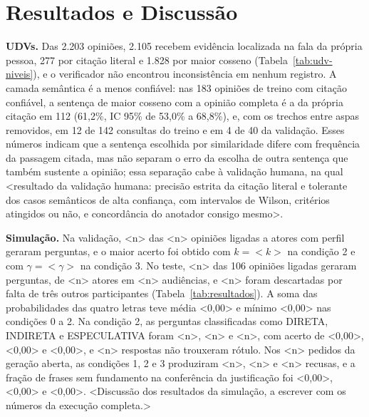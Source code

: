 \section{Resultados e Discuss\~ao}
\label{sec:resultados}

\textbf{UDVs.} Das 2.203 opiniões, 2.105 recebem evidência localizada na fala da própria pessoa, 277
por citação literal e 1.828 por maior cosseno (Tabela~\ref{tab:udv-niveis}), e o verificador não
encontrou inconsistência em nenhum registro. A camada semântica é a menos confiável: nas 183
opiniões de treino com citação confiável, a sentença de maior cosseno com a opinião completa é a da
própria citação em 112 (61,2\%, IC 95\% de 53,0\% a 68,8\%), e, com os trechos entre aspas removidos,
em 12 de 142 consultas do treino e em 4 de 40 da validação. Esses números indicam que a sentença
escolhida por similaridade difere com frequência da passagem citada, mas não separam o erro da
escolha de outra sentença que também sustente a opinião; essa separação cabe à validação humana, na
qual <resultado da validação humana: precisão estrita da citação literal e tolerante dos casos
semânticos de alta confiança, com intervalos de Wilson, critérios atingidos ou não, e concordância do
anotador consigo mesmo>.

\textbf{Simulação.} Na validação, <n> das <n> opiniões ligadas a atores com perfil geraram perguntas,
e o maior acerto foi obtido com $k = {<}k{>}$ na condição 2 e com $\gamma = {<}\gamma{>}$ na condição 3.
No teste, <n> das 106 opiniões ligadas geraram perguntas, de <n> atores em <n> audiências, e <n>
foram descartadas por falta de três outros participantes (Tabela~\ref{tab:resultados}). A soma das
probabilidades das quatro letras teve média <0,00> e mínimo <0,00> nas condições 0 a 2. Na condição
2, as perguntas classificadas como DIRETA, INDIRETA e ESPECULATIVA foram <n>, <n> e <n>, com acerto
de <0,00>, <0,00> e <0,00>, e <n> respostas não trouxeram rótulo. Nos <n> pedidos da geração aberta,
as condições 1, 2 e 3 produziram <n>, <n> e <n> recusas, e a fração de frases sem fundamento na
conferência da justificação foi <0,00>, <0,00> e <0,00>. <Discussão dos resultados da simulação, a
escrever com os números da execução completa.>




